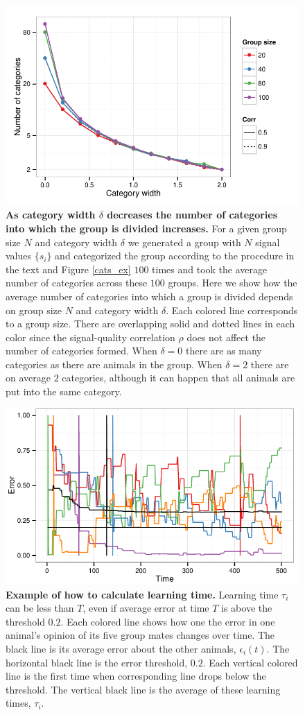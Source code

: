 \begin{figure}[ht]
\includegraphics[width=.8\textwidth]{figures/number_of_categories.pdf}
\caption{\sffamily\small\textbf{As category width $\delta$ decreases the number of categories into which the group is divided increases.}
For a given group size $N$ and category width $\delta$ we generated a group with $N$ signal values $\{s_i\}$ and categorized the group according to the procedure in the text and Figure \ref{cats_ex} $100$ times and took the average number of categories across these $100$ groups. Here we show how the average number of categories into which a group is divided depends on group size $N$ and category width $\delta$.  Each colored line corresponds to a group size. There are overlapping solid and dotted lines in each color since the signal-quality correlation $\rho$ does not affect the number of categories formed. When $\delta=0$ there are as many categories as there are animals in the group. When $\delta=2$ there are on average $2$ categories, although it can happen that all animals are put into the same category. }
\label{num_cat}
\end{figure}

\begin{figure}[ht]
\includegraphics[width=.8\textwidth]{figures/learning_time_example.pdf}
\caption{\label{learnT.ex} \sffamily\small\textbf{Example of how to calculate learning time.} Learning time $\tau_i$ can be less than $T$, even if average error at time $T$ is above the threshold $0.2$. Each colored line shows how one the error in one animal's opinion of its five group mates changes over time. The black line is its average error about the other animals, $\epsilon_i(t)$. The horizontal black line is the error threshold, $0.2$. Each vertical colored line is the first time when corresponding line drops below the threshold. The vertical black line is the average of these learning times, $\tau_i$.}
\end{figure}

